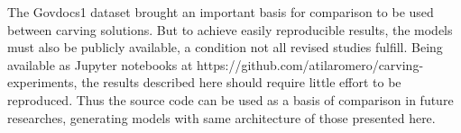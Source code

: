 The Govdocs1 dataset brought an important basis for comparison to be used between carving solutions. But to achieve easily reproducible results, the models must also be publicly available, a condition not all revised studies fulfill. Being available as Jupyter notebooks at https://github.com/atilaromero/carving-experiments, the results described here should require little effort to be reproduced. Thus the source code can be used as a basis of comparison in future researches, generating models with same architecture of those presented here.
